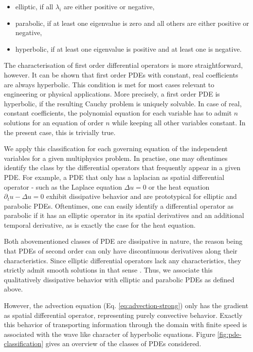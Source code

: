 \documentclass[sn-mathphys,Numbered]{sn-jnl}%
\theoremstyle{thmstyleone}%
\theoremstyle{thmstyletwo}%
\theoremstyle{thmstylethree}%
\begin{document}
\begin{itemize}
    \item elliptic, if all $\lambda_i$ are either positive or negative,
    \item parabolic, if at least one eigenvalue is zero and all others are either positive or negative,
    \item hyperbolic, if at least one eigenvalue is positive and at least one is negative.
\end{itemize}

The characterisation of first order differential operators is more straightforward, however.
It can be shown that first order PDEs with constant, real coefficients are always hyperbolic.
This condition is met for most cases relevant to engineering or physical applications.
More precisely, a first order PDE is hyperbolic, if the resulting Cauchy problem is uniquely solvable.
In case of real, constant coefficients, the polynomial equation for each variable has to admit $n$ solutions for an equation of order $n$ while keeping all other variables constant.
In the present case, this is trivially true.

We apply this classification for each governing equation of the independent variables for a given multiphysics problem.
In practise, one may oftentimes identify the class by the differential operators that frequently appear in a given PDE.
For example, a PDE that only has a laplacian as spatial differential operator - such as the Laplace equation $\Delta u = 0$ or the heat equation $\partial_t u - \Delta u = 0$ exhibit dissipative behavior and are prototypical for elliptic and parabolic PDEs.
Oftentimes, one can easily identify a differential operator as parabolic if it has an elliptic operator in its spatial derivatives and an additional temporal derivative, as is exactly the case for the heat equation.

Both abovementioned classes of PDE are dissipative in nature, the reason being that PDEs of second order can only have discontinuous derivatives along their characteristics.
Since elliptic differential operators lack any characteristics, they strictly admit smooth solutions in that sense \cite{pinchoverIntroductionPartialDifferential2005}.
Thus, we associate this qualitatively dissipative behavior with elliptic and parabolic PDEs as defined above.

However, the advection equation (Eq. \ref{eq:advection-strong}) only has the gradient as spatial differential operator, representing purely convective behavior.
Exactly this behavior of transporting information through the domain with finite speed is associated with the wave like character of hyperbolic equations.
Figure \ref{fig:pde-classification} gives an overview of the classes of PDEs considered.
\end{document}
